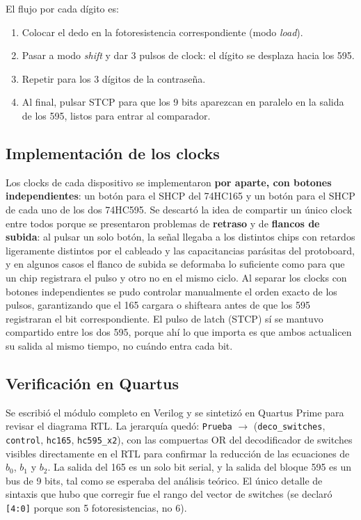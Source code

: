 \documentclass[10pt,conference]{IEEEtran}
\begin{document}
	El flujo por cada d\'igito es:
	\begin{enumerate}
		\item Colocar el dedo en la fotoresistencia correspondiente (modo \emph{load}).
		\item Pasar a modo \emph{shift} y dar 3 pulsos de clock: el d\'igito se desplaza
		hacia los 595.
		\item Repetir para los 3 d\'igitos de la contrase\~na.
		\item Al final, pulsar STCP para que los 9 bits aparezcan en paralelo en la salida
		de los 595, listos para entrar al comparador.
	\end{enumerate}
	
	\subsection*{Implementaci\'on de los clocks}
	Los clocks de cada dispositivo se implementaron \textbf{por aparte, con botones
		independientes}: un bot\'on para el SHCP del 74HC165 y un bot\'on para el SHCP de
	cada uno de los dos 74HC595. Se descart\'o la idea de compartir un \'unico clock
	entre todos porque se presentaron problemas de \textbf{retraso} y de
	\textbf{flancos de subida}: al pulsar un solo bot\'on, la se\~nal llegaba a los
	distintos chips con retardos ligeramente distintos por el cableado y las
	capacitancias par\'asitas del protoboard, y en algunos casos el flanco de subida
	se deformaba lo suficiente como para que un chip registrara el pulso y otro no en
	el mismo ciclo. Al separar los clocks con botones independientes se pudo controlar
	manualmente el orden exacto de los pulsos, garantizando que el 165 cargara o
	shifteara antes de que los 595 registraran el bit correspondiente. El pulso de
	latch (STCP) s\'i se mantuvo compartido entre los dos 595, porque ah\'i lo que
	importa es que ambos actualicen su salida al mismo tiempo, no cu\'ando entra cada
	bit.
	
	\subsection*{Verificaci\'on en Quartus}
	Se escribi\'o el m\'odulo completo en Verilog y se sintetiz\'o en Quartus Prime para
	revisar el diagrama RTL. La jerarqu\'ia qued\'o:
	\texttt{Prueba} $\rightarrow$ (\texttt{deco\_switches}, \texttt{control},
	\texttt{hc165}, \texttt{hc595\_x2}), con las compuertas OR del decodificador de
	switches visibles directamente en el RTL para confirmar la reducci\'on de las
	ecuaciones de $b_0$, $b_1$ y $b_2$. La salida del 165 es un solo bit serial, y la
	salida del bloque 595 es un bus de 9 bits, tal como se esperaba del an\'alisis
	te\'orico. El \'unico detalle de sintaxis que hubo que corregir fue el rango del
	vector de switches (se declar\'o \texttt{[4:0]} porque son 5 fotoresistencias,
	no 6).
	
\end{document}
